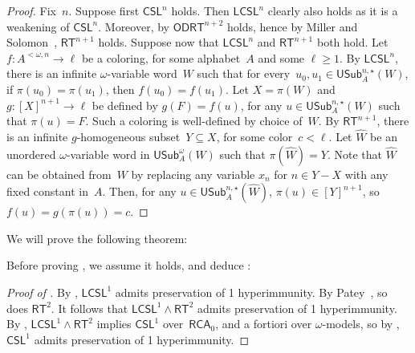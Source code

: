 \documentclass{article}
\def\h{\hat}
\newcommand{\RCA}[0]{\mathsf{RCA}}
\newcommand{\RT}[0]{\mathsf{RT}}
\newcommand{\CSL}[0]{\mathsf{CSL}}
\newcommand{\ODRT}[0]{\mathsf{ODRT}}
\newcommand{\LCSL}[0]{\mathsf{LCSL}}
\newcommand{\NN}[0]{\mathbb{N}}
\newcommand{\USub}{\mathsf{USub}}
\newtheorem{theorem}{Theorem}
\numberwithin{theorem}{section}
\newtheorem{lemma}[theorem]{Lemma}
\theoremstyle{definition}
\begin{document}
\begin{proof}
Fix~$n$. Suppose first $\CSL^n$ holds. Then $\LCSL^n$ clearly also holds as it is a weakening of $\CSL^n$. Moreover, by  $\ODRT^{n+2}$ holds, hence by Miller and Solomon~\cite[Theorem 2.3]{miller2004effectiveness}, $\RT^{n+1}$ holds.
Suppose now that $\LCSL^n$ and $\RT^{n+1}$ both hold. Let $f : A^{<\omega, n} \to \ell$ be a coloring, for some alphabet~$A$ and some $\ell \geq 1$.
By $\LCSL^n$, there is an infinite $\omega$-variable word~$W$ such that for every~$u_0, u_1 \in \USub^{n,\star}_A(W)$, if $\pi(u_0) = \pi(u_1)$, then $f(u_0) = f(u_1)$. Let $X = \pi(W)$ and $g : [X]^{n+1} \to \ell$ be defined by $g(F) = f(u)$, for any $u \in \USub^{n,\star}_A(W)$ such that $\pi(u) = F$. Such a coloring is well-defined by choice of~$W$. By $\RT^{n+1}$, there is an infinite $g$-homogeneous subset~$Y \subseteq X$, for some color~$c < \ell$. Let $\h W$ be an unordered $\omega$-variable word in $\USub^\omega_A(W)$ such that $\pi(\h W) = Y$. Note that $\h W$ can be obtained from~$W$ by replacing any variable $x_n$ for $n \in Y - X$ with any fixed constant in~$A$. Then, for any $u \in \USub^{n,\star}_A(\h W)$, $\pi(u) \in [Y]^{n+1}$, so $f(u) = g(\pi(u)) = c$.
\end{proof}

We will prove the following theorem:


Before proving , we assume it holds, and deduce :

\begin{proof}[Proof of ]
By , $\LCSL^1$ admits preservation of 1 hyperimmunity.
By Patey~\cite[Theorem 23]{patey2017iterative}, so does $\RT^2$. It follows that $\LCSL^1 \wedge \RT^2$
admits preservation of 1 hyperimmunity. By , $\LCSL^1 \wedge \RT^2$ implies $\CSL^1$ over~$\RCA_0$, and a fortiori over $\omega$-models, so by , $\CSL^1$ admits preservation of 1 hyperimmunity.
\end{proof}
\end{document}
